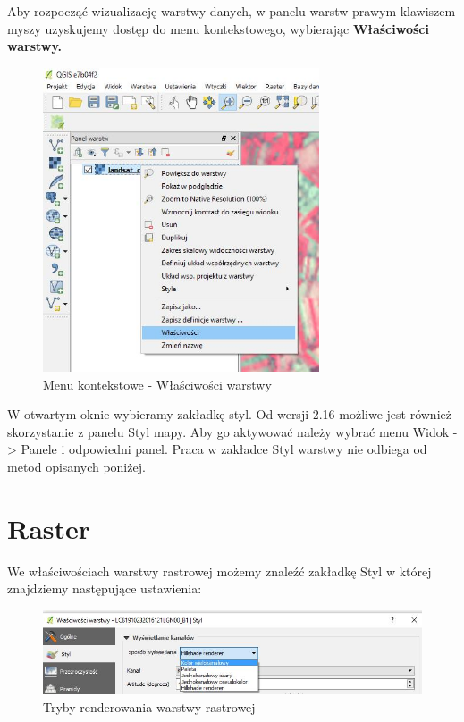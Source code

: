 \documentclass[12pt,a4paper]{book}
\begin{document}
Aby rozpocząć wizualizację warstwy danych, w panelu warstw prawym klawiszem myszy uzyskujemy dostęp do menu kontekstowego, wybierając \textbf{Właściwości warstwy.}
\begin{figure}[!ht]
	\centering
	\includegraphics[height=9cm]{007-kontekstowe.jpg}
	\caption{Menu kontekstowe - Właściwości warstwy}
\end{figure}

W otwartym oknie wybieramy zakładkę styl. Od wersji 2.16 możliwe jest również skorzystanie z panelu Styl mapy. Aby go aktywować należy wybrać menu  Widok -{\textgreater} Panele  i odpowiedni panel. Praca w zakładce Styl warstwy nie odbiega od metod opisanych poniżej.
\section{Raster}
We właściwościach warstwy rastrowej możemy znaleźć zakładkę Styl w której znajdziemy następujące ustawienia:
\begin{figure}[ht]
	\centering
	\includegraphics[height=2.5cm]{007-raster-tryby.jpg}
	\caption{Tryby renderowania warstwy rastrowej}
\end{figure}
\end{document}
